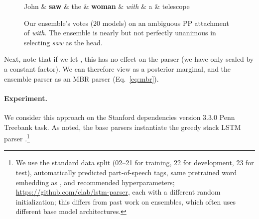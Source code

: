 \documentclass[11pt,letterpaper]{article}
\newcommand{\ignore}[1]{}
\newcommand{\nascomment}[1]{\ignore{\textcolor{blue}{{\textbf{[#1 --\textsc{nas}]}}}}}
\newcommand{\miguelcomment}[1]{\ignore{\textcolor{red}{{\textbf{[#1 --\textsc{miguel}]}}}}}
\begin{document}
\begin{figure}
\begin{dependency}
  \centering
  \begin{deptext}
  John \& \textbf{saw} \& the \& \textbf{woman} \& \emph{with} \& a \& telescope\\
  \end{deptext}
     \end{dependency}
     \caption{Our ensemble's votes (20 models) on an ambiguous PP attachment of \emph{with}. \ignore{\nascomment{I took out the 0 to John; why show that when there's also 0 to the, with, a, and telescope? also switched arrow direction}}The ensemble is nearly but not perfectly unanimous in selecting \emph{saw} as the head.}
     \label{ensembling_figure}
 \end{figure}



Next, note that if we let , this has no effect on the parser (we have only scaled by a constant factor).  We can therefore view  as a posterior marginal, and the ensemble parser as an MBR parser (Eq.~\ref{eq:mbr}).   



\paragraph{Experiment.}


We consider this approach on the Stanford dependencies version 3.3.0 \cite{stanford_dependencies} Penn Treebank task.
As noted, the base parsers instantiate the greedy stack LSTM parser \cite{stack_lstm}.\footnote{We use the standard data split (02--21 for training, 22 for development, 23 for test), automatically predicted part-of-speech tags, same pretrained word embedding as , and recommended hyperparameters; \url{https://github.com/clab/lstm-parser},\ignore{\miguelcomment{and pretrained word embeddings -> just say that it is the same setting as the best result of dyer et al. 2015}} each with a different random initialization; this differs
from past work on ensembles, which often uses different base model architectures. \ignore{\miguelcomment{We are using different base models since they have different random initialization... maybe explain (accuracy)? otherwise the reader might be confused with the fact that ensembling the same parser 20 times improves the accuracy}}  \ignore{\nascomment{need to explain jackknifing here?}}}
\end{document}
